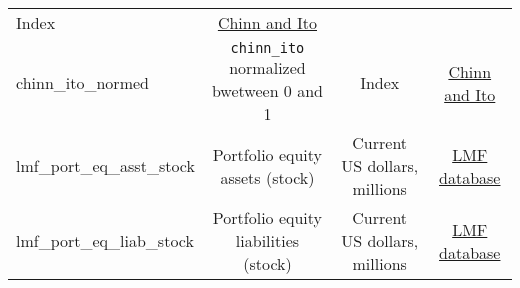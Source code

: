 \documentclass[]{article}
\begin{document}
\begin{longtable}[]{@{}lccc@{}}
\begin{minipage}[t]{0.24\columnwidth}
Index\strut
\end{minipage} & \begin{minipage}[t]{0.15\columnwidth}\centering\strut
\href{http://web.pdx.edu/~ito/Chinn-Ito_website.htm}{Chinn and
Ito}\strut
\end{minipage}\tabularnewline
\begin{minipage}[t]{0.14\columnwidth}\raggedright\strut
chinn\_ito\_normed\strut
\end{minipage} & \begin{minipage}[t]{0.36\columnwidth}\centering\strut
\texttt{chinn\_ito} normalized bwetween 0 and 1\strut
\end{minipage} & \begin{minipage}[t]{0.24\columnwidth}\centering\strut
Index\strut
\end{minipage} & \begin{minipage}[t]{0.15\columnwidth}\centering\strut
\href{http://web.pdx.edu/~ito/Chinn-Ito_website.htm}{Chinn and
Ito}\strut
\end{minipage}\tabularnewline
\begin{minipage}[t]{0.14\columnwidth}\raggedright\strut
lmf\_port\_eq\_asst\_stock\strut
\end{minipage} & \begin{minipage}[t]{0.36\columnwidth}\centering\strut
Portfolio equity assets (stock)\strut
\end{minipage} & \begin{minipage}[t]{0.24\columnwidth}\centering\strut
Current US dollars, millions\strut
\end{minipage} & \begin{minipage}[t]{0.15\columnwidth}\centering\strut
\href{http://www.philiplane.org/EWN.html}{LMF database}\strut
\end{minipage}\tabularnewline
\begin{minipage}[t]{0.14\columnwidth}\raggedright\strut
lmf\_port\_eq\_liab\_stock\strut
\end{minipage} & \begin{minipage}[t]{0.36\columnwidth}\centering\strut
Portfolio equity liabilities (stock)\strut
\end{minipage} & \begin{minipage}[t]{0.24\columnwidth}\centering\strut
Current US dollars, millions\strut
\end{minipage} & \begin{minipage}[t]{0.15\columnwidth}\centering\strut
\href{http://www.philiplane.org/EWN.html}{LMF database}\strut

\end{minipage}
\end{longtable}
\end{document}
